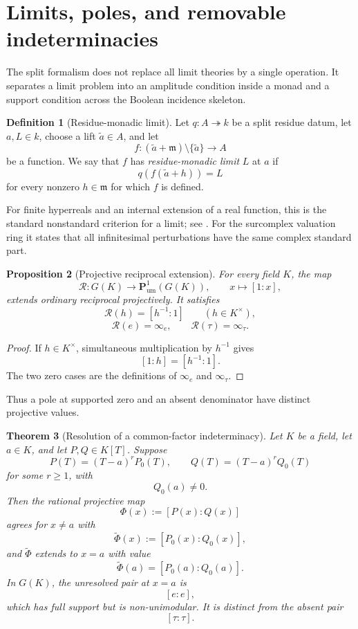 \documentclass[11pt]{amsart}
\numberwithin{equation}{section}
\newtheorem{theorem}{Theorem}[section]
\newtheorem{proposition}[theorem]{Proposition}
\theoremstyle{definition}
\newtheorem{definition}[theorem]{Definition}
\newcommand{\Pum}{\mathbf P_{\mathrm{um}}}
\begin{document}
\section{Limits, poles, and removable indeterminacies}

The split formalism does not replace all limit theories by a single operation.  It separates a limit problem into an amplitude condition inside a monad and a support condition across the Boolean incidence skeleton.

\begin{definition}[Residue-monadic limit]\label{def:monadic-limit}
Let $q:A\twoheadrightarrow k$ be a split residue datum, let $a,L\in k$, choose a lift $\widetilde a\in A$, and let
\[
f:(\widetilde a+\mathfrak m)\setminus\{\widetilde a\}\longrightarrow A
\]
be a function.  We say that $f$ has \emph{residue-monadic limit} $L$ at $a$ if
\[
q(f(\widetilde a+h))=L
\]
for every nonzero $h\in\mathfrak m$ for which $f$ is defined.
\end{definition}

For finite hyperreals and an internal extension of a real function, this is the standard nonstandard criterion for a limit; see \cite{Robinson,Goldblatt}.  For the surcomplex valuation ring it states that all infinitesimal perturbations have the same complex standard part.

\begin{proposition}[Projective reciprocal extension]\label{prop:reciprocal-extension}
For every field $K$, the map
\[
\mathcal R:G(K)\longrightarrow\Pum^1(G(K)),
\qquad
x\longmapsto[1:x],
\]
extends ordinary reciprocal projectively.  It satisfies
\[
\mathcal R(h)=[h^{-1}:1]
\qquad(h\in K^\times),
\]
\[
\mathcal R(e)=\infty_e,
\qquad
\mathcal R(\tau)=\infty_\tau.
\]
\end{proposition}

\begin{proof}
If $h\in K^\times$, simultaneous multiplication by $h^{-1}$ gives
\[
[1:h]=[h^{-1}:1].
\]
The two zero cases are the definitions of $\infty_e$ and $\infty_\tau$.
\end{proof}

Thus a pole at supported zero and an absent denominator have distinct projective values.

\begin{theorem}[Resolution of a common-factor indeterminacy]\label{thm:common-factor-resolution}
Let $K$ be a field, let $a\in K$, and let $P,Q\in K[T]$.  Suppose
\[
P(T)=(T-a)^rP_0(T),
\qquad
Q(T)=(T-a)^rQ_0(T)
\]
for some $r\ge1$, with
\[
Q_0(a)\neq0.
\]
Then the rational projective map
\[
\Phi(x):=[P(x):Q(x)]
\]
agrees for $x\neq a$ with
\[
\widetilde\Phi(x):=[P_0(x):Q_0(x)],
\]
and $\widetilde\Phi$ extends to $x=a$ with value
\[
\widetilde\Phi(a)=[P_0(a):Q_0(a)].
\]
In $G(K)$, the unresolved pair at $x=a$ is
\[
[e:e],
\]
which has full support but is non-unimodular.  It is distinct from the absent pair
\[
[\tau:\tau].
\]
\end{theorem}
\end{document}
